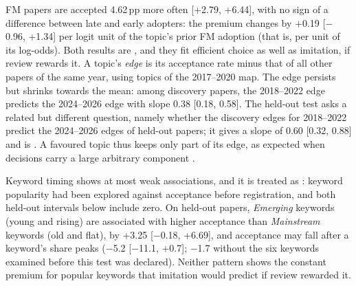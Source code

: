 FM papers are accepted 4.62\,pp more often [+2.79, +6.44], with no sign of a difference between late and early
adopters: the premium changes by +0.19 [$-$0.96, +1.34] per logit unit of the topic's prior FM adoption (that is, per
unit of its log-odds). Both results are , and they fit efficient choice as well as imitation, if
review rewards it. A topic's \emph{edge} is its acceptance rate minus that of all other papers of the same year, using
topics of the 2017--2020 map. The edge persists but shrinks towards the mean: among discovery papers, the 2018--2022
edge predicts the 2024--2026 edge with slope 0.38 [0.18, 0.58]. The held-out test asks a related but different
question, namely whether the discovery edges for 2018--2022 predict the 2024--2026 edges of held-out papers; it gives a
slope of 0.60 [0.32, 0.88] and is . A favoured topic thus keeps only part of its edge, as
expected when decisions carry a large arbitrary component \citep{cortes2021inconsistency,beygelzimer2023has}.

Keyword timing shows at most weak associations, and it is treated as : keyword popularity had been
explored against acceptance before registration, and both held-out intervals below include zero. On held-out papers,
\emph{Emerging} keywords (young and rising) are associated with higher acceptance than \emph{Mainstream} keywords (old
and flat), by +3.25 [$-$0.18, +6.69], and acceptance may fall after a keyword's share peaks ($-$5.2 [$-$11.1, +0.7];
$-$1.7 without the six keywords examined before this test was declared). Neither pattern shows the constant premium for
popular keywords that imitation would predict if review rewarded it.

